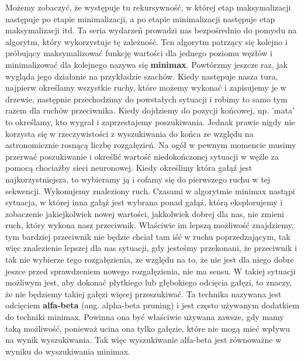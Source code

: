 Możemy zobaczyć, że występuje tu rekursywność, w której etap maksymalizacji następuje po etapie minimalizacji, a po etapie minimalizacji następuje etap maksymalizacji itd. Ta seria wydarzeń prowadzi nas bezpośrednio do pomysłu na algorytm, który wykorzystuje tę zależność. Ten algorytm patrzący się kolejno i próbujący maksymalizować funkcję wartości dla jednego poziomu węzłów i minimalizować dla kolejnego nazywa się \textbf{minimax}. Powtórzmy jeszcze raz, jak wygląda jego działanie na przykładzie szachów. Kiedy następuje nasza tura, najpierw określamy wszystkie ruchy, które możemy wykonać i zapisujemy je w drzewie, następnie przechodzimy do powstałych sytuacji i robimy to samo tym razem dla ruchów przeciwnika. Kiedy dojdziemy do pozycji końcowej, np. 'mata' to określamy, kto wygrał i zaprzestajemy poszukiwania. Jednak prawie nigdy nie korzysta się w rzeczywistości z wyszukiwania do końca ze względu na astronomicznie rosnącą liczbę rozgałęzień. Na ogół w pewnym momencie musimy przerwać poszukiwanie i określić wartość niedokończonej sytuacji w węźle za pomocą chociażby sieci neuronowej. Kiedy określimy która gałąź jest najkorzystniejsza, to wybieramy ją i cofamy się do pierwszego ruchu w tej sekwencji. Wykonujemy znaleziony ruch. Czasami w algorytmie minimax nastąpi sytuacja, w której inna gałąź jest wybrana ponad gałąź, którą eksplorujemy i zobaczenie jakiejkolwiek nowej wartości, jakkolwiek dobrej dla nas, nie zmieni ruch, który wykona nasz przeciwnik. Właściwie im lepszą możliwość znajdziemy, tym bardziej przeciwnik nie będzie chciał tam iść w ruchu poprzedzającym, tak więc znalezienie lepszej dla nas sytuacji, gdy jesteśmy przekonani, że przeciwnik i tak nie wybierze tego rozgałęzienia, ze względu na to, że nie jest dla niego dobre jeszce przed sprawdzeniem nowego rozgałęzienia, nie ma sensu. W takiej sytuacji możliwym jest, aby dokonać płytkiego lub głębokiego odcięcia gałęzi, to znaczy, że nie będziemy takiej gałęzi więcej przeszukiwać. Ta technika nazywana jest odcięciem \textbf{alfa-beta} (ang. alpha-beta pruning) i jest często używanym dodatkiem do techniki minimax. Powinna ona być właściwie używana zawsze, gdy mamy taką możliwość, ponieważ ucina ona tylko gałęzie, które nie mogą mieć wpływu na wynik wyszukiwania. Tak więc wyszukiwanie alfa-beta jest równoważne w wyniku do wyszukiwania minimax.\newline

